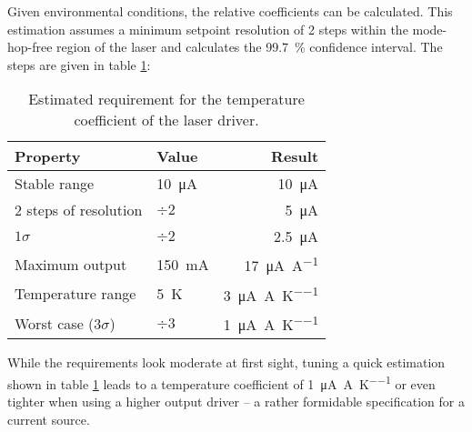 Given environmental conditions, the relative coefficients can be calculated. This estimation assumes a minimum setpoint resolution of 2 steps within the mode-hop-free region of the laser and calculates the \qty{99.7}{\percent} confidence interval. The steps are given in table \ref{tab:dgdrive_tempco}:
\begin{table}[hb]
    \centering
    \begin{tabular}{llr}
        \toprule
        Property& Value& Result \\
        \midrule
        Stable range & \qty{10}{\uA}& \qty{10}{\uA}\\
        2 steps of resolution  & $\div 2$& \qty{5}{\uA} \\
        $1 \sigma$  & $\div 2$& \qty{2.5}{\uA} \\
        Maximum output& \qty{150}{\mA}& \qty{17}{\uA \per \A}\\
        Temperature range& \qty{5}{\K}& \qty{3}{\uA \per \A \per \K}\\
        Worst case ($3 \sigma$)& $\div 3$& \qty{1}{\uA \per \A \per \K}\\
        \bottomrule
    \end{tabular}
    \caption{Estimated requirement for the temperature coefficient of the laser driver.}
    \label{tab:dgdrive_tempco}
\end{table}

While the requirements look moderate at first sight, tuning a quick estimation shown in table \ref{tab:dgdrive_tempco} leads to a temperature coefficient of \qty[per-mode = symbol]{1}{\uA \per \A \per \K} or even tighter when using a higher output driver -- a rather formidable specification for a current source.

